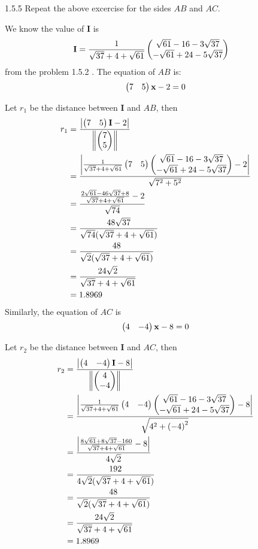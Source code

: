 \documentclass[]{article}
\begin{document}
\let\vec\mathbf


1.5.5 Repeat the above excercise for the sides $AB$ and $AC$.

\solution  
We know the value of $\vec{I}$ is
\begin{align}
\vec{I} &= \frac{1}{\sqrt{37} + 4 + \sqrt{61}} \myvec{\sqrt{61} - 16 - 3\sqrt{37}\\ -\sqrt{61} + 24 - 5\sqrt{37}}
\end{align}
from the problem 1.5.2 .
The equation of $AB$ is:
\begin{align}
\myvec{7&5}\vec{x} - 2=0
\end{align}

Let $r_1$ be the distance between $\vec{I}$ and $AB$, then
\begin{align}
r_1 &= \frac{\abs{\myvec{7&5} \vec{I} - 2}}{\norm{\myvec{7 \\ 5}}} \\
&= \frac{\abs{\frac{1}{\sqrt{37} + 4 + \sqrt{61}} \myvec{7&5} \myvec{\sqrt{61} - 16 - 3\sqrt{37}\\ -\sqrt{61} + 24 - 5\sqrt{37}} - 2}}{\sqrt{{7}^2 + {5}^2}} \\
&= \frac{\frac{2\sqrt{61} - 46\sqrt{37} + 8}{\sqrt{37} + 4 + \sqrt{61}} - 2}{\sqrt{74}} \\
&= \frac{48\sqrt{37}}{\sqrt{74} {(\sqrt{37} + 4 + \sqrt{61}})} \\
&= \frac{48}{\sqrt{2}(\sqrt{37} + 4 + \sqrt{61})}\\
&= \frac{24\sqrt{2}}{\sqrt{37}+4+\sqrt{61}}\\
&= 1.8969                                        
\end{align}
Similarly, the equation of $AC$ is
\begin{align}
\myvec{4&-4}\vec{x} - 8=0
\end{align}

Let $r_2$ be the distance between $\vec{I}$ and $AC$, then
\begin{align}
r_2 &= \frac{\abs{\myvec{4&-4} \vec{I} - 8}}{\norm{\myvec{4 \\ -4}}} \\
&= \frac{\abs{\frac{1}{\sqrt{37} + 4 + \sqrt{61}} \myvec{4&-4} \myvec{\sqrt{61} - 16 - 3\sqrt{37}\\ -\sqrt{61} + 24 - 5\sqrt{37}} - 8}}{\sqrt{{4}^2 + {(-4)}^2}} \\
&= \frac{\abs{\frac{8\sqrt{61} + 8\sqrt{37} - 160}{\sqrt{37} + 4 + \sqrt{61}} - 8}}{4\sqrt{2}} \\
&= \frac{192}{4\sqrt{2} {(\sqrt{37} + 4 + \sqrt{61}})} \\
&= \frac{48}{\sqrt{2}(\sqrt{37} + 4 + \sqrt{61})}\\
&= \frac{24\sqrt{2}}{\sqrt{37}+4+\sqrt{61}}\\
&= 1.8969        
\end{align}
\end{document}
